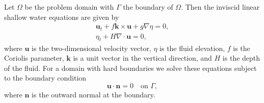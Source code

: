 Let $\Omega$ be the problem domain with $\Gamma$ the boundary of $\Omega$.
Then the inviscid linear shallow water equations are given by
\cite{Hanert2004, LeBlond1981, Le-Roux1998}
\begin{equation}
  \begin{split}
    \mathbf{u}_t + f\mathbf{k} \times \mathbf{u} + g \nabla \eta = 0, \\
    \eta_t + H \nabla\cdot \mathbf{u} = 0,
  \end{split}
  \label{eqn:SWE}
\end{equation}
where $\mathbf{u}$ is the two-dimensional velocity vector, $\eta$ is the
fluid elevation, $f$ is the Coriolis parameter, $\mathbf{k}$ is a unit
vector in the vertical direction, and $H$ is the depth of the fluid. For a
domain with hard boundaries we solve these equations subject to the boundary
condition
\begin{equation}
  \mathbf{u}\cdot \mathbf{n} = 0 \quad \text{on } \Gamma,
  \label{eqn:BCs}
\end{equation}
where $\mathbf{n}$ is the outward normal at the boundary.

